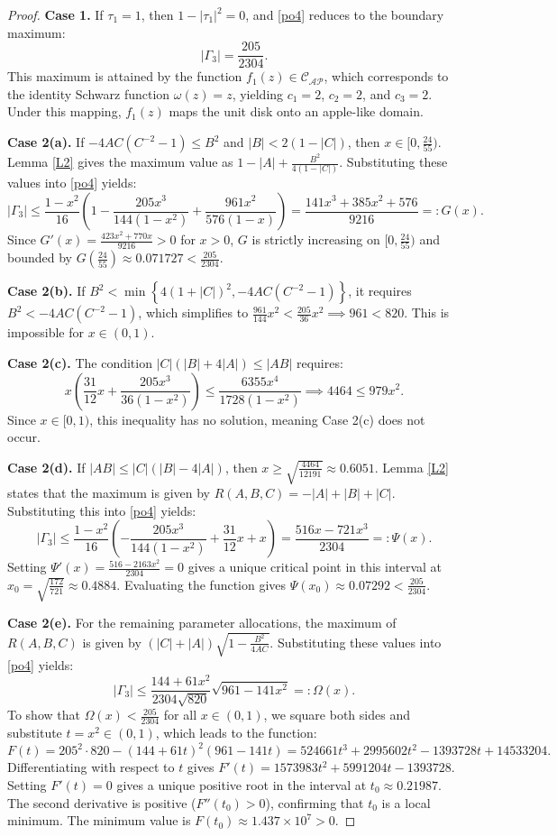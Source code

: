 \documentclass[10pt,a4paper]{amsart}
\numberwithin{equation}{section}
\begin{document}
\begin{proof}
\medskip
\noindent \textbf{Case 1.} If $\tau_1 = 1$, then $1-|\tau_1|^2 = 0$, and \eqref{po4} reduces to the boundary maximum:
\[
|\Gamma_3| = \frac{205}{2304}.
\]
This maximum is attained by the function $f_1(z) \in \mathcal{C}_{\mathcal{AP}}$, which corresponds to the identity Schwarz function $\omega(z) = z$, yielding $c_1=2$, $c_2=2$, and $c_3=2$. Under this mapping, $f_1(z)$ maps the unit disk onto an apple-like domain.

\medskip
\noindent \textbf{Case 2(a).} If $-4AC(C^{-2}-1) \le B^2$ and $|B| < 2(1-|C|)$, then $x \in [0, \frac{24}{55})$. Lemma \ref{L2} gives the maximum value as $1 - |A| + \frac{B^2}{4(1-|C|)}$. Substituting these values into \eqref{po4} yields:
\[
|\Gamma_3| \le \frac{1-x^2}{16} \left( 1 - \frac{205x^3}{144(1-x^2)} + \frac{961x^2}{576(1-x)}\right) = \frac{141x^3 + 385x^2 + 576}{9216} =: G(x).
\]
Since $G'(x) = \frac{423x^2 + 770x}{9216} > 0$ for $x > 0$, $G$ is strictly increasing on $[0, \frac{24}{55})$ and bounded by $G\left( \frac{24}{55} \right) \approx 0.071727 < \frac{205}{2304}$.

\medskip
\noindent \textbf{Case 2(b).} If $B^2 < \min\left\{4(1+|C|)^2, -4AC(C^{-2}-1)\right\}$, it requires $B^2 < -4AC(C^{-2}-1)$, which simplifies to $\frac{961}{144}x^2 < \frac{205}{36}x^2 \implies 961 < 820$. This is impossible for $x \in (0,1)$.

\medskip
\noindent \textbf{Case 2(c).} The condition $|C|(|B|+4|A|) \le |AB|$ requires:
\[
x \left( \frac{31}{12}x + \frac{205x^3}{36(1-x^2)} \right) \le \frac{6355x^4}{1728(1-x^2)} \implies 4464 \le 979x^2.
\]
Since $x \in [0,1)$, this inequality has no solution, meaning Case 2(c) does not occur.

\medskip
\noindent \textbf{Case 2(d).} If $|AB| \le |C|(|B|-4|A|)$, then $x \ge \sqrt{\frac{4464}{12191}} \approx 0.6051$. Lemma \ref{L2} states that the maximum is given by $R(A,B,C) = -|A| + |B| + |C|$. Substituting this into \eqref{po4} yields:
\[
|\Gamma_3| \le \frac{1-x^2}{16}\left( -\frac{205x^3}{144(1-x^2)} + \frac{31}{12}x + x \right) = \frac{516x - 721x^3}{2304} =: \Psi(x).
\]
Setting $\Psi'(x) = \frac{516 - 2163x^2}{2304} = 0$ gives a unique critical point in this interval at $x_0 = \sqrt{\frac{172}{721}} \approx 0.4884$. Evaluating the function gives $\Psi(x_0) \approx 0.07292 < \frac{205}{2304}$.

\medskip
\noindent \textbf{Case 2(e).} For the remaining parameter allocations, the maximum of $R(A,B,C)$ is given by $(|C|+|A| )\sqrt{1-\frac{B^2}{4AC}}$. Substituting these values into \eqref{po4} yields:
\[
|\Gamma_3| \le \frac{144+61x^2}{2304\sqrt{820}} \sqrt{961-141x^2} =: \Omega(x).
\]
To show that $\Omega(x) < \frac{205}{2304}$ for all $x \in (0,1)$, we square both sides and substitute $t = x^2 \in (0,1)$, which leads to the function:
\[
F(t) = 205^2 \cdot 820 - (144+61t)^2(961-141t) = 524661t^3 + 2995602t^2 - 1393728t + 14533204.
\]
Differentiating with respect to $t$ gives $F'(t) = 1573983t^2 + 5991204t - 1393728$. Setting $F'(t) = 0$ gives a unique positive root in the interval at $t_0 \approx 0.21987$. The second derivative is positive ($F''(t_0) > 0$), confirming that $t_0$ is a local minimum. The minimum value is $F(t_0) \approx 1.437 \times 10^7 > 0$.


\end{proof}
\end{document}
